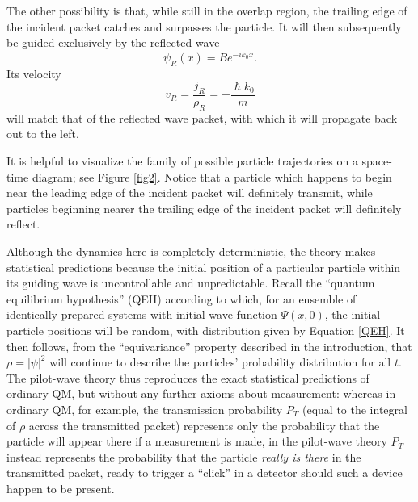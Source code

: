 \documentclass[aps,prc,onecolumn,letterpaper,floatfix,12pt]{revtex4}
\renewcommand{\hbar}{\hslash}
\begin{document}
The other possibility is that, while still in the overlap region, the
trailing edge of the incident packet catches and surpasses the
particle.  It will then subsequently be guided exclusively by the
reflected wave
\begin{equation}
\psi_R(x) = B e^{-i k_0 x}.
\end{equation}
Its velocity
\begin{equation}
v_R = \frac{j_R}{\rho_R} = - \frac{\hbar k_0}{m}
\end{equation}
will match that of the reflected wave packet, with which it will
propagate back out to the left.  


It is helpful to visualize the family of possible particle
trajectories on a space-time diagram; see Figure \ref{fig2}.  Notice
that a particle which happens to begin near the leading edge of the
incident packet will definitely transmit, while particles beginning
nearer the trailing edge of the incident packet will definitely
reflect.  

Although the dynamics here is completely deterministic, the
theory makes statistical predictions because the initial position of a
particular particle within its guiding wave is uncontrollable and
unpredictable.  Recall the ``quantum equilibrium hypothesis'' (QEH)
according to which, for an ensemble of identically-prepared systems
with initial wave function $\Psi(x,0)$, the initial particle positions
will be random, with distribution given by Equation
\eqref{QEH}.  It then follows, from the ``equivariance'' property
described in the introduction, that $\rho = |\psi|^2$ will continue to
describe the particles' probability distribution for all $t$.  The
pilot-wave theory thus reproduces the exact statistical predictions of
ordinary QM, but without any further axioms about measurement:
whereas in ordinary QM, for example, the transmission probability $P_T$
(equal to the integral of $\rho$ across the transmitted packet)
represents only the probability that the particle will appear there if
a measurement is made, in the pilot-wave theory $P_T$ instead represents
the probability that the particle \emph{really is there} in the
transmitted packet, ready to trigger a ``click'' in a detector should
such a device happen to be present.  
\end{document}
